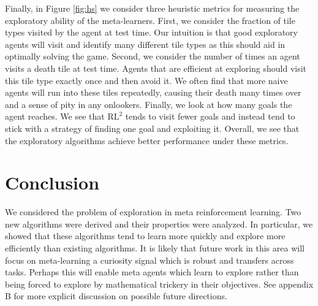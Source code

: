 \documentclass{article} %
\begin{document}
Finally, in Figure \ref{fig:hs} we consider three heuristic metrics for measuring the exploratory ability of the meta-learners. First, we consider the fraction of tile types visited by the agent at test time. Our intuition is that good exploratory agents will visit and identify many different tile types as this should aid in optimally solving the game. Second, we consider the number of times an agent visits a death tile at test time. Agents that are efficient at exploring should visit this tile type exactly once and then avoid it. We often find that more naive agents will run into these tiles repeatedly, causing their death many times over and a sense of pity in any onlookers. Finally, we look at how many goals the agent reaches. We see that $\text{RL}^2$ tends to visit fewer goals and instead tend to stick with a strategy of finding one goal and exploiting it. Overall, we see that the exploratory algorithms achieve better performance under these metrics. 

\section{Conclusion} 
We considered the problem of exploration in meta reinforcement learning. Two new algorithms were derived and their properties were analyzed. In particular, we showed that these algorithms tend to learn more quickly and explore more efficiently than existing algorithms. It is likely that future work in this area will focus on meta-learning a curiosity signal which is robust and transfers across tasks. Perhaps this will enable meta agents which learn to explore rather than being forced to explore by mathematical trickery in their objectives. See appendix B for more explicit discussion on possible future directions. 
\end{document}
